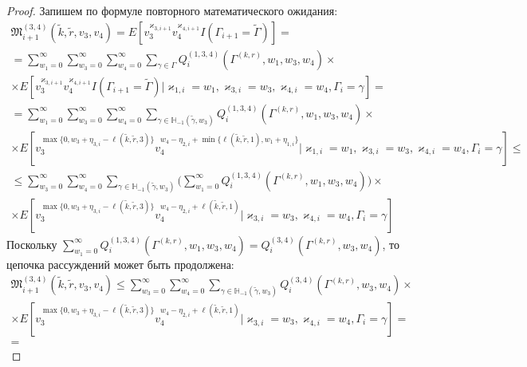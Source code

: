 \documentclass[a4paper,12pt,russian]{extarticle}
\begin{document}
\begin{proof}
Запишем по формуле повторного математического ожидания:
\begin{multline}
\mathfrak{M}^{(3,4)}_{i+1}(\tilde{k},\tilde{r},v_3,v_4) = E[v_3^{\varkappa_{3,i+1}} v_4^{\varkappa_{4,i+1}}I(\Gamma_{i+1}=\tilde{\Gamma})] = \\ =
\sum_{w_1=0}^{\infty} \sum_{w_3=0}^{\infty}  \sum_{w_4=0}^{\infty} \sum_{\gamma \in \Gamma}  Q^{(1,3,4)}_i(\Gamma^{(k,r)},w_1, w_3,w_4) \times \\ \times 
E[v_3^{\varkappa_{3,i+1} }v_4^{\varkappa_{4,i+1}}I(\Gamma_{i+1}=\tilde{\Gamma}) | \varkappa_{1,i}=w_1,\varkappa_{3,i}=w_3, \varkappa_{4,i}=w_4, \Gamma_i=\gamma] = \\ =
\sum_{w_1=0}^{\infty} \sum_{w_3=0}^{\infty} \sum_{w_4=0}^{\infty} \sum_{\gamma \in {\mathbb H}_{-1}(\tilde{\gamma},w_3)}  Q^{(1,3,4)}_i(\Gamma^{(k,r)},w_1, w_3,w_4) 
\times \\ \times E[v_3^{\max{\{0, w_3 + \eta_{3,i} - \ell(\tilde{k},\tilde{r},3)\}}}  v_4^{w_4 - \eta_{2,i} + \min{\{\ell(\tilde{k},\tilde{r},1), w_1 + \eta_{1,i} \}}} | \varkappa_{1,i}=w_1,\varkappa_{3,i}=w_3, \varkappa_{4,i}=w_4, \Gamma_i=\gamma] \leqslant \\ \leqslant
 \sum_{w_3=0}^{\infty} \sum_{w_4=0}^{\infty}  \sum_{\gamma \in {\mathbb H}_{-1}(\tilde{\gamma},w_3)}  \bigl( \sum_{w_1=0}^{\infty}Q^{(1,3,4)}_i(\Gamma^{(k,r)},w_1, w_3,w_4) \bigr)
\times \\ \times E[v_3^{\max{\{0, w_3 + \eta_{3,i} - \ell(\tilde{k},\tilde{r},3)\}}}  v_4^{w_4 - \eta_{2,i} + \ell(\tilde{k},\tilde{r},1)} | \varkappa_{3,i}=w_3, \varkappa_{4,i}=w_4, \Gamma_i=\gamma] 
\label{third:fourth:try:gen}
\end{multline}
Поскольку $\sum_{w_1=0}^{\infty}Q^{(1,3,4)}_i(\Gamma^{(k,r)},w_1, w_3,w_4) =Q^{(3,4)}_i(\Gamma^{(k,r)}, w_3,w_4) $, то цепочка рассуждений может быть продолжена:
\begin{multline*}
    \mathfrak{M}^{(3,4)}_{i+1}(\tilde{k},\tilde{r},v_3,v_4) \leqslant
     \sum_{w_3=0}^{\infty}  \sum_{w_4=0}^{\infty} \sum_{\gamma \in {\mathbb H}_{-1}(\tilde{\gamma},w_3)}  Q^{(3,4)}_i(\Gamma^{(k,r)},w_3,w_4) 
\times \\ \times E[v_3^{\max{\{0, w_3 + \eta_{3,i} - \ell(\tilde{k},\tilde{r},3)\}}}  v_4^{w_4 - \eta_{2,i} + \ell(\tilde{k},\tilde{r},1)} | \varkappa_{3,i}=w_3, \varkappa_{4,i}=w_4, \Gamma_i=\gamma] = \\ =

\end{multline*}
\end{proof}
\end{document}
